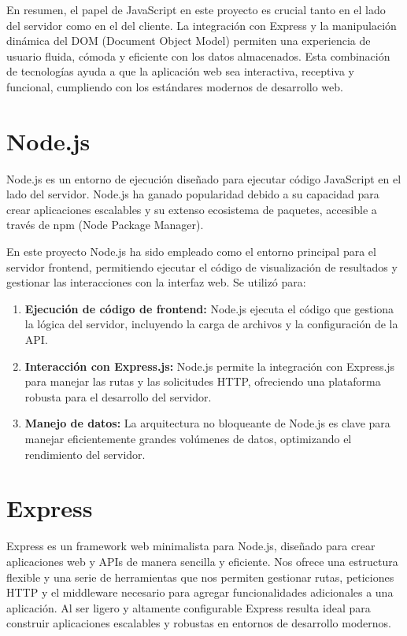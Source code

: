 \documentclass[a4paper, 12pt]{book}
\begin{document}
En resumen, el papel de JavaScript en este proyecto es crucial tanto en el lado del servidor como en el del cliente. La integración con Express y la manipulación dinámica del DOM (Document Object Model) permiten una experiencia de usuario fluida, cómoda y eficiente con los datos almacenados. Esta combinación de tecnologías ayuda a que la aplicación web sea interactiva, receptiva y funcional, cumpliendo con los estándares modernos de desarrollo web.

\section{Node.js}
Node.js \cite{casciaro_nodejs} es un entorno de ejecución diseñado para ejecutar código JavaScript en el lado del servidor. Node.js ha ganado popularidad debido a su capacidad para crear aplicaciones escalables y su extenso ecosistema de paquetes, accesible a través de npm (Node Package Manager).

En este proyecto Node.js ha sido empleado como el entorno principal para el servidor frontend, permitiendo ejecutar el código de visualización de resultados y gestionar las interacciones con la interfaz web. Se utilizó para:

\begin{enumerate}
    \item \textbf{Ejecución de código de frontend:} Node.js ejecuta el código que gestiona la lógica del servidor, incluyendo la carga de archivos y la configuración de la API.
    \item \textbf{Interacción con Express.js:} Node.js permite la integración con Express.js para manejar las rutas y las solicitudes HTTP, ofreciendo una plataforma robusta para el desarrollo del servidor.
    \item \textbf{Manejo de datos:} La arquitectura no bloqueante de Node.js es clave para manejar eficientemente grandes volúmenes de datos, optimizando el rendimiento del servidor.
\end{enumerate}

\section{Express}
Express \cite{brown_node_express} es un framework web minimalista para Node.js, diseñado para crear aplicaciones web y APIs de manera sencilla y eficiente. Nos ofrece una estructura flexible y una serie de herramientas que nos permiten gestionar rutas, peticiones HTTP y el middleware necesario para agregar funcionalidades adicionales a una aplicación. Al ser ligero y altamente configurable Express resulta ideal para construir aplicaciones escalables y robustas en entornos de desarrollo modernos.
\end{document}
